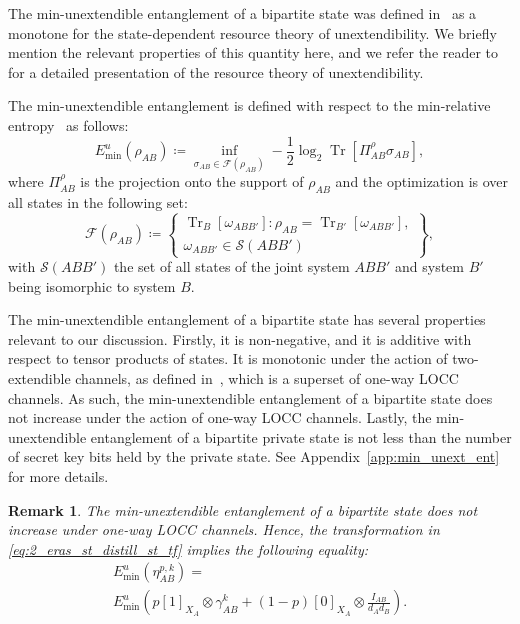\documentclass[twocolumn,letterpaper, dvipsnames,allowtoday, accepted = 2025-12-31]{quantumarticle}
\newtheorem{remark}{Remark}
\begin{document}
The min-unextendible entanglement of a bipartite state was defined in~\cite[Sec.~4.2]{WWW21} as a monotone for the state-dependent resource theory of unextendibility. We briefly mention the relevant properties of this quantity here, and we refer the reader to~\cite{WWW21} for a detailed presentation of the resource theory of unextendibility.

The min-unextendible entanglement is defined with respect to the min-relative entropy~\cite[Def.~2]{Dat09} as follows:
\begin{equation}
    E^u_{\operatorname{min}}\!\left(\rho_{AB}\right) \coloneqq \inf_{\sigma_{AB}\in \mathcal{F}\left(\rho_{AB}\right)}-\frac{1}{2} \log_2 \operatorname{Tr}\!\left[\Pi^{\rho}_{AB}\sigma_{AB}\right],
\end{equation}
where $\Pi^{\rho}_{AB}$ is the projection onto the support of $\rho_{AB}$ and the optimization is over all states in the following set:
\begin{equation}\label{eq:extension_set}
     \mathcal{F}\!\left(\rho_{AB}\right) \coloneqq \left\{
     \begin{array}{c}
         \operatorname{Tr}_{B}\!\left[\omega_{ABB'}\right]:  
         
          \rho_{AB} = \operatorname{Tr}_{B'}\!\left[\omega_{ABB'}\right],\\
          \omega_{ABB'} \in \mathcal{S}\!\left(ABB'\right)
     \end{array}
         \right\},
 \end{equation}
with $\mathcal{S}\!\left(ABB'\right)$ the set of all states of the joint system $ABB'$ and system $B'$ being isomorphic to system $B$. 

The min-unextendible entanglement of a bipartite state has several properties relevant to our discussion. Firstly, it is non-negative, and it is additive with respect to tensor products of states. It is monotonic under the action of two-extendible channels, as defined in~\cite{KDWW19, KDWW21}, which is a superset of one-way LOCC channels. As such, the min-unextendible entanglement of a bipartite state does not increase under the action of one-way LOCC channels. Lastly, the min-unextendible entanglement of a bipartite private state is not less than the number of secret key bits held by the private state. See Appendix~\ref{app:min_unext_ent} for more details. 

\begin{remark}\label{rem:min_uenxt_ent_eq_tf}
    The min-unextendible entanglement of a bipartite state does not increase under one-way LOCC channels. Hence, the transformation in \eqref{eq:2_eras_st_distill_st_tf} implies the following equality:
    \begin{multline}
        E^u_{\min}\!\left(\eta^{p,k}_{AB}\right) =\\ E^u_{\min}\!\left(p[1]_{X_A}\otimes \gamma^k_{AB} + (1-p)[0]_{X_A}\otimes\frac{I_{AB}}{d_Ad_B}\right).
    \end{multline}
\end{remark}
\end{document}
